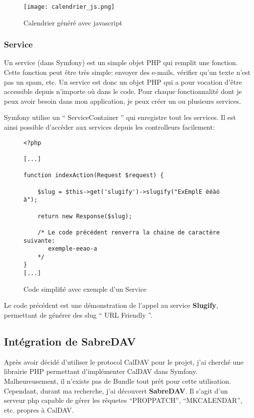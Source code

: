 \begin{figure}[h]
\begin{center}
\texttt{[image: calendrier\_js.png]}
\end{center}
\caption{Calendrier généré avec javascript}
\end{figure}

\newpage

\subsubsection*{Service}

Un service (dans Symfony) est un simple objet PHP qui remplit une fonction. Cette fonction peut être très simple: envoyer des e-mails, vérifier qu'un texte n'est pas un spam, etc. Un service est donc un objet PHP qui a pour vocation d'être accessible depuis n'importe où dans le code. Pour chaque fonctionnalité dont je peux avoir besoin dans mon application, je peux créer un ou plusieurs services.

Symfony utilise un `` ServiceContainer '' qui enregistre tout les services. Il est ainsi possible d'accèder aux services depuis les controlleurs facilement:

\begin{figure}[h]
\begin{lstlisting}[frame=single]
<?php

[...]

function indexAction(Request $request) {

    $slug = $this->get('slugify')->slugify("ExEmplE èéàó à");

    return new Response($slug);

    /* Le code précédent renverra la chaine de caractère suivante:
       exemple-eeao-a
    */
}
[...]

\end{lstlisting}
\caption{Code simplifié avec exemple d'un Service}
\end{figure}

Le code précédent est une démonstration de l'appel au service \textbf{Slugify}, permettant de générer des slug `` URL Friendly ''.

\subsection{Intégration de SabreDAV}

Après avoir décidé d'utiliser le protocol CalDAV pour le projet, j'ai cherché une librairie PHP permettant d'implémenter CalDAV dans Symfony. Malheureusement, il n'existe pas de Bundle tout prêt pour cette utilisation. Cependant, durant ma recherche, j'ai découvert \textbf{SabreDAV}. Il s'agit d'un serveur php capable de gérer les rêquetes ``PROPPATCH'', ``MKCALENDAR'', etc. propres à CalDAV.

